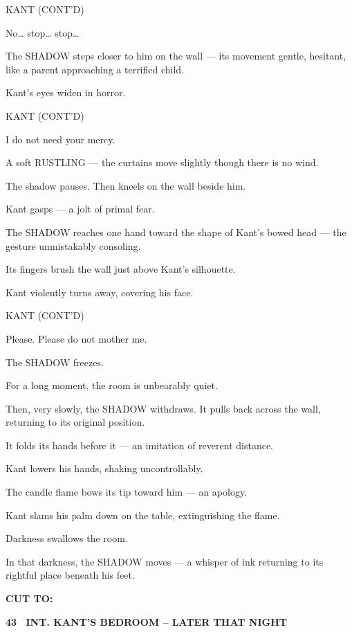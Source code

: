\documentclass[12pt]{article}
\newcommand{\scene}[2]{%
  \vspace{1.8\baselineskip}%
  \noindent\textbf{#1 \ #2}\par\vspace{0.4\baselineskip}%
}
\newenvironment{dialogue}[1]{%
  \vspace{0.8\baselineskip}%
  \noindent\hspace*{2.3in}\textsc{#1}\par%
  \noindent\hspace*{1.5in}\begin{minipage}[t]{4.5in}%
}{%
  \end{minipage}\par%
}
\newcommand{\transition}[1]{%
  \vspace{0.6\baselineskip}%
  \begin{flushright}\textbf{#1}\end{flushright}%
}
\begin{document}
\begin{dialogue}{KANT (CONT'D)}
No… stop… stop…
\end{dialogue}

The SHADOW steps closer to him on the wall —
its movement gentle, hesitant, like a parent approaching a terrified child.

Kant’s eyes widen in horror.

\begin{dialogue}{KANT (CONT'D)}
I do not need your mercy.
\end{dialogue}

A soft RUSTLING —
the curtains move slightly though there is no wind.

The shadow pauses.
Then kneels on the wall beside him.

Kant gasps — a jolt of primal fear.

The SHADOW reaches one hand toward the shape of Kant’s bowed head —
the gesture unmistakably consoling.

Its fingers brush the wall just above Kant’s silhouette.

Kant violently turns away, covering his face.

\begin{dialogue}{KANT (CONT'D)}
Please.
Please do not mother me.
\end{dialogue}

The SHADOW freezes.

For a long moment, the room is unbearably quiet.

Then, very slowly, the SHADOW withdraws.
It pulls back across the wall, returning to its original position.

It folds its hands before it —
an imitation of reverent distance.

Kant lowers his hands, shaking uncontrollably.

The candle flame bows its tip toward him —
an apology.

Kant slams his palm down on the table, extinguishing the flame.

Darkness swallows the room.

In that darkness, the SHADOW moves —
a whisper of ink returning to its rightful place beneath his feet.

\transition{CUT TO:}


\scene{43}{INT. KANT'S BEDROOM -- LATER THAT NIGHT}
\end{document}
